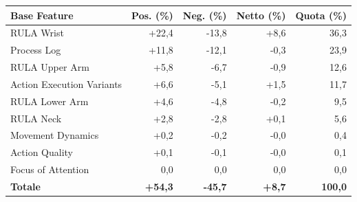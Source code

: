 \begin{tabular*}{\linewidth}{@{}l@{\extracolsep{\fill}}rrrr@{}}
\toprule
\textbf{Base Feature} & \textbf{Pos. (\%)} & \textbf{Neg. (\%)} & \textbf{Netto (\%)} & \textbf{Quota (\%)} \\
\midrule
RULA Wrist & +22{,}4 & -13{,}8 & +8{,}6 & 36{,}3 \\
Process Log & +11{,}8 & -12{,}1 & -0{,}3 & 23{,}9 \\
RULA Upper Arm & +5{,}8 & -6{,}7 & -0{,}9 & 12{,}6 \\
Action Execution Variants & +6{,}6 & -5{,}1 & +1{,}5 & 11{,}7 \\
RULA Lower Arm & +4{,}6 & -4{,}8 & -0{,}2 & 9{,}5 \\
RULA Neck & +2{,}8 & -2{,}8 & +0{,}1 & 5{,}6 \\
Movement Dynamics & +0{,}2 & -0{,}2 & -0{,}0 & 0{,}4 \\
Action Quality & +0{,}1 & -0{,}1 & -0{,}0 & 0{,}1 \\
Focus of Attention & 0{,}0 & 0{,}0 & 0{,}0 & 0{,}0 \\
\midrule
\textbf{Totale} & \textbf{+54{,}3} & \textbf{-45{,}7} & \textbf{+8{,}7} & \textbf{100{,}0} \\
\bottomrule
\end{tabular*}
